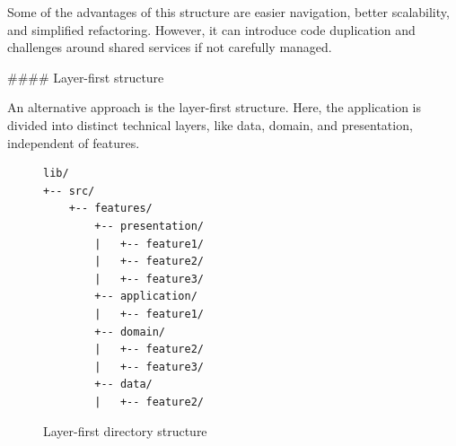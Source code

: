\documentclass[
  digital,     %
  oneside,     %
  nosansbold,  %
  nocolorbold, %
  lof,         %
  lot,         %
]{fithesis4}
\begin{document}
\begin{markdown}

Some of the advantages of this structure are easier navigation, better scalability, and simplified refactoring.  
However, it can introduce code duplication and challenges around shared services if not carefully managed.

#### Layer-first structure

An alternative approach is the layer-first structure. Here, the application is divided into distinct technical layers, like data, domain, and presentation, independent of features.


\end{markdown}
\begin{figure}[ht]
  \begin{center}
    \begin{minipage}{.8\textwidth}
      \begin{verbatim}
lib/
+-- src/
    +-- features/
        +-- presentation/
        |   +-- feature1/
        |   +-- feature2/
        |   +-- feature3/
        +-- application/
        |   +-- feature1/
        +-- domain/
        |   +-- feature2/
        |   +-- feature3/
        +-- data/
        |   +-- feature2/
      \end{verbatim}
    \end{minipage}
  \end{center}
  \caption{Layer-first directory structure}
  \label{fig:project_directory_layer_first}
\end{figure}
\end{document}
